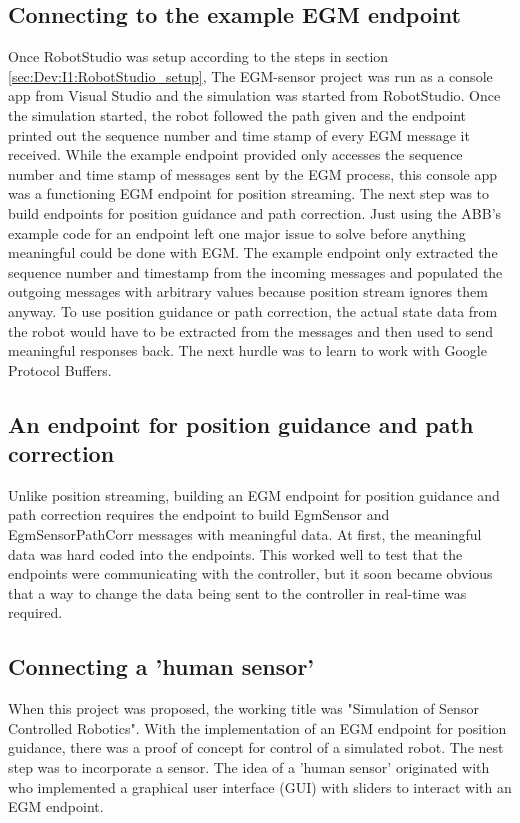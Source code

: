 \documentclass{cslthse-msc}
\begin{document}
\subsection{Connecting to the example EGM endpoint}
\label{sec:Dev:I1:conn_endpoint}
Once RobotStudio was setup according to the steps in section \ref{sec:Dev:I1:RobotStudio_setup}, The EGM-sensor project was run as a console app from Visual Studio and the simulation was started from RobotStudio. Once the simulation started, the robot followed the path given and the endpoint printed out the sequence number and time stamp of every EGM message it received. While the example endpoint provided only accesses the sequence number and time stamp of messages sent by the EGM process, this console app was a functioning EGM endpoint for position streaming. The next step was to build endpoints for position guidance and path correction. Just using the ABB's example code for an endpoint left one major issue to solve before anything meaningful could be done with EGM. The example endpoint only extracted the sequence number and timestamp from the incoming messages and populated the outgoing messages with arbitrary values because position stream ignores them anyway. To use position guidance or path correction, the actual state data from the robot would have to be extracted from the messages and then used to send meaningful responses back. The next hurdle was to learn to work with Google Protocol Buffers. \\


\subsection{An endpoint for position guidance and path correction}
\label{sec:Dev:I1:guide_corr_endpoints}
Unlike position streaming, building an EGM endpoint for position guidance and path correction requires the endpoint to build EgmSensor and EgmSensorPathCorr messages with meaningful data. At first, the meaningful data was hard coded into the endpoints. This worked well to test that the endpoints were communicating with the controller, but it soon became obvious that a way to change the data being sent to the controller in real-time was required. 

\subsection{Connecting a 'human sensor'}
\label{sec:Dev:I1:human_sensor}
When this project was proposed, the working title was "Simulation of Sensor Controlled Robotics". With the implementation of an EGM endpoint for position guidance, there was a proof of concept for control of a simulated robot. The nest step was to incorporate a sensor. The idea of a 'human sensor' originated with \cite{Castillo:YouTube} who implemented a graphical user interface (GUI) with sliders to interact with an EGM endpoint.\par
\end{document}
